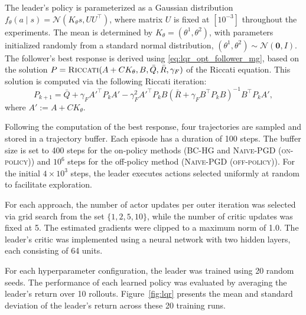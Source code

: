 \documentclass[letterpaper]{article} %
\begin{document}
The leader’s policy is parameterized as a Gaussian distribution $f_{\theta}(a \mid s) = \mathcal{N}(K_{\theta} s, UU^\top)$,  
where matrix $U$ is fixed at $[10^{-3}]$ throughout the experiments. 
The mean is determined by $K_{\theta} = (\theta^1, \theta^2)$, with parameters initialized randomly from a standard normal distribution, $(\theta^1, \theta^2) \sim \mathcal{N}(\bm{0}, I)$.
The follower’s best response is derived using \eqref{eq:lqr_opt_follower_mg}, based on the solution $P=\text{\textsc{Riccati}}(A+C K_{\theta}, B, \bar{Q}, \bar{R}, \gamma_F)$ of the Riccati equation. This solution is computed via the following Riccati iteration:
\begin{equation}
    P_{k+1} = \bar{Q} + \gamma_F A'^\top P_k A' - \gamma_F^2 A'^\top P_k B (\bar{R} + \gamma_F B^\top P_k B)^{-1} B^\top P_k A',
\end{equation}
where $A':=A+C K_{\theta}$.

Following the computation of the best response, four trajectories are sampled and stored in a trajectory buffer.  
Each episode has a duration of 100 steps. 
The buffer size is set to 400 steps for the on-policy methods (\textsc{BC-HG} and \textsc{Naive-PGD (on-policy)}) and $10^6$ steps for the off-policy method (\textsc{Naive-PGD (off-policy)}).
For the initial $4 \times 10^3$ steps, the leader executes actions selected uniformly at random to facilitate exploration.

For each approach, the number of actor updates per outer iteration was selected via grid search from the set $\{1, 2, 5, 10\}$, while the number of critic updates was fixed at 5.
The estimated gradients were clipped to a maximum norm of 1.0.  
The leader’s critic was implemented using a neural network with two hidden layers, each consisting of 64 units.

For each hyperparameter configuration, the leader was trained using 20 random seeds.  
The performance of each learned policy was evaluated by averaging the leader’s return over 10 rollouts.  
Figure~\ref{fig:lqr} presents the mean and standard deviation of the leader’s return across these 20 training runs.
\end{document}
